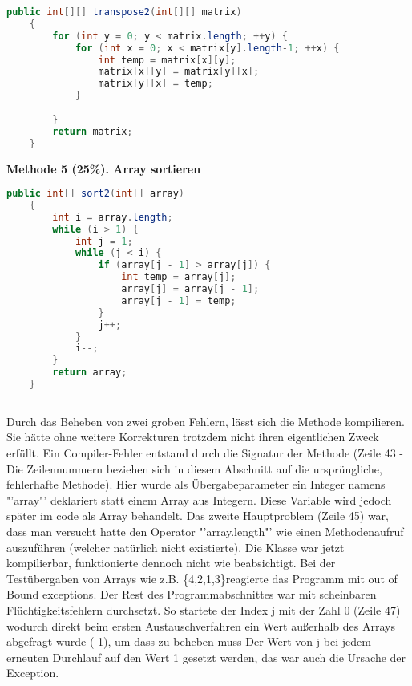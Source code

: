 \documentclass{pi1}
\begin{document}
\begin{lstlisting}[caption={\emph{transpose2()}: modifizierte transpose() Methode}, firstnumber=98, language=Java]
    public int[][] transpose2(int[][] matrix) 
    {
        for (int y = 0; y < matrix.length; ++y) {
            for (int x = 0; x < matrix[y].length-1; ++x) {
                int temp = matrix[x][y]; 
                matrix[x][y] = matrix[y][x]; 
                matrix[y][x] = temp;
            } 
            
        }
        return matrix; 
    } 
\end{lstlisting}
      

\textbf{Methode 5 (25\%). Array sortieren}
\begin{lstlisting}[caption={\emph{sort2()}: Korrigierte sort() Methode}, firstnumber=127, language=Java]
public int[] sort2(int[] array)
    {
        int i = array.length;
        while (i > 1) {
            int j = 1;
            while (j < i) {
                if (array[j - 1] > array[j]) {
                    int temp = array[j];
                    array[j] = array[j - 1];
                    array[j - 1] = temp;
                }
                j++;
            }
            i--;
        }
        return array;
    }
    
\end{lstlisting}
Durch das Beheben von zwei groben Fehlern, lässt sich die Methode kompilieren. Sie hätte ohne weitere Korrekturen trotzdem nicht ihren eigentlichen Zweck erfüllt.
Ein Compiler-Fehler entstand durch die Signatur der Methode (Zeile 43 - Die Zeilennummern beziehen sich in diesem Abschnitt auf die ursprüngliche, fehlerhafte Methode). Hier wurde als Übergabeparameter ein Integer namens "'array"' deklariert statt einem Array aus Integern. Diese Variable wird jedoch später im code als Array behandelt. Das zweite Hauptproblem (Zeile 45) war, dass man versucht hatte den Operator "'array.length"' wie einen Methodenaufruf auszuführen (welcher natürlich nicht existierte).\newline
Die Klasse war jetzt kompilierbar, funktionierte dennoch nicht wie beabsichtigt.
Bei der Testübergaben von Arrays wie z.B. \{4,2,1,3\}reagierte das Programm mit out of Bound exceptions. Der Rest des Programmabschnittes war mit scheinbaren Flüchtigkeitsfehlern durchsetzt. So startete der Index j mit der Zahl 0 (Zeile 47) wodurch direkt beim ersten Austauschverfahren ein Wert außerhalb des Arrays abgefragt wurde (-1), um dass zu beheben muss Der Wert von j bei jedem erneuten Durchlauf auf den Wert 1 gesetzt werden, das war auch die Ursache der Exception.\newline
\end{document}

